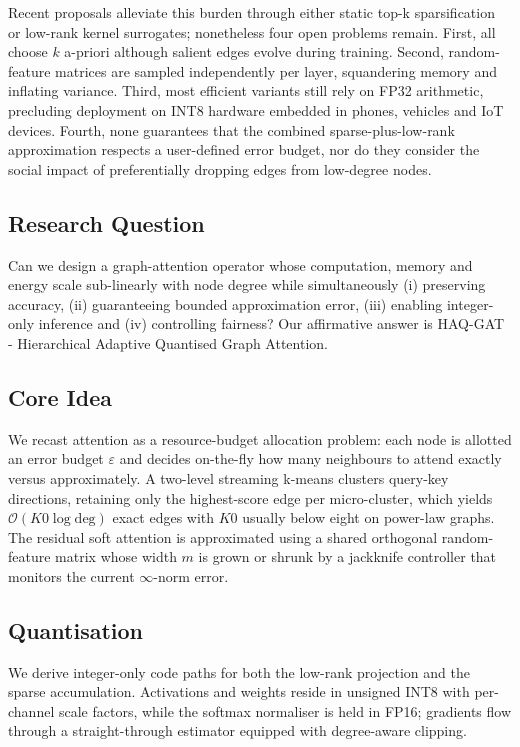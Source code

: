 \documentclass{article} %
\begin{document}
Recent proposals alleviate this burden through either static top-k sparsification or low-rank kernel surrogates; nonetheless four open problems remain. First, all choose \(k\) a-priori although salient edges evolve during training. Second, random-feature matrices are sampled independently per layer, squandering memory and inflating variance. Third, most efficient variants still rely on FP32 arithmetic, precluding deployment on INT8 hardware embedded in phones, vehicles and IoT devices. Fourth, none guarantees that the combined sparse-plus-low-rank approximation respects a user-defined error budget, nor do they consider the social impact of preferentially dropping edges from low-degree nodes.

\subsection{Research Question}
Can we design a graph-attention operator whose computation, memory and energy scale sub-linearly with node degree while simultaneously (i) preserving accuracy, (ii) guaranteeing bounded approximation error, (iii) enabling integer-only inference and (iv) controlling fairness? Our affirmative answer is HAQ-GAT - Hierarchical Adaptive Quantised Graph Attention.

\subsection{Core Idea}
We recast attention as a resource-budget allocation problem: each node is allotted an error budget \(\varepsilon\) and decides on-the-fly how many neighbours to attend exactly versus approximately. A two-level streaming k-means clusters query-key directions, retaining only the highest-score edge per micro-cluster, which yields \(\mathcal{O}(K0 \log \mathrm{deg})\) exact edges with \(K0\) usually below eight on power-law graphs. The residual soft attention is approximated using a shared orthogonal random-feature matrix whose width \(m\) is grown or shrunk by a jackknife controller that monitors the current \(\infty\)-norm error.

\subsection{Quantisation}
We derive integer-only code paths for both the low-rank projection and the sparse accumulation. Activations and weights reside in unsigned INT8 with per-channel scale factors, while the softmax normaliser is held in FP16; gradients flow through a straight-through estimator equipped with degree-aware clipping.
\end{document}
